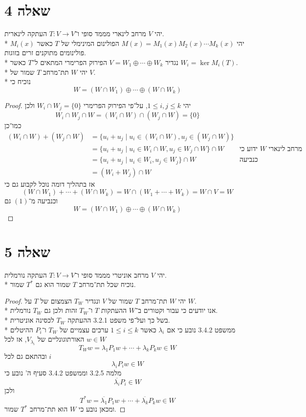 \section{שאלה 4}
יהי $V$ מרחב לינארי מממד סופי ו־$T : V \to V$ העתקה לינארית. \\*
יהי $M(x) = M_1(x) M_2(x) \cdots M_k(x)$ הפולינום המינימלי של $T$ כאשר $M_i(x)$ פולינומים מתוקנים זרים בזוגות. \\*
נגדיר $V = W_1 \oplus \cdots \oplus W_k$ הפירוק הפרימרי המתאים ל־$T$ כאשר $W_i = \ker M_i(T)$. \\*
יהי $W$ תת־מרחב $T$ שמור של $V$. \\*
נוכיח כי
\[
	W = (W \cap W_1) \oplus \cdots \oplus (W \cap W_k)
\]
\begin{proof}
	יהי $1 \le i, j \le k$, על־פי הפירוק הפרימרי $W_i \cap W_j = \{0\}$ ולכן
	\[
		W_i \cap W_j \cap W = (W_i \cap W) \cap (W_j \cap W) = \{ 0 \} \tag{1}
	\]
	כמו־כן
	\begin{align*}
		(W_i \cap W) + \left(W_j \cap W\right)
		& = \{ u_i + u_j \mid u_i \in (W_i \cap W), u_j \in (W_j \cap W) \} \\
		& = \{ u_i + u_j \mid u_i \in W_i \cap W, u_j \in W_j \cap W \} \cap W & \text{ידוע כי $W$ מרחב לינארי} \\
		& = \{ u_i + u_j \mid u_i \in W_i, u_j \in W_j \} \cap W & \text{כנביעה מתכונות המרחב} \\
		& = (W_i + W_j) \cap W
	\end{align*}
	אז בתהליך דומה נוכל לקבוע גם כי
	\[
		(W \cap W_1) + \cdots + (W \cap W_k) = W \cap (W_1 + \cdots + W_k) = W \cap V = W
	\]
	וכנביעה מ־$(1)$ גם
	\[
		W = (W \cap W_1) \oplus \cdots \oplus (W \cap W_k)
	\]
\end{proof}

\section{שאלה 5}
יהי $V$ מרחב אוניטרי מממד סופי ו־$T : V \to V$ העתקה נורמלית. \\*
נוכיח שכל תת־מרחב $T$ שמור הוא גם $T^*$ שמור.
\begin{proof}
	יהי $W$ תת־מרחב $T$ שמור של $V$ ונגדיר $T_W$ הצמצום של $T$ על $W$. \\*
	אנו יודעים כי עבור וקטורים ב־$W$ ההעתקות $T$ ו־$T_W$ זהות ולכן גם $T_W$ נורמלית. \\*
	בשל כך ועל־פי משפט 3.2.1 ההעתקה $T_W$ לכסינה אוניטרית. \\*
	ממשפט 3.4.2 נובע כי אם $\lambda_i$ כאשר $1 \le i \le k$ ערכים עצמיים של $T_W$ ו־$P_i$ ההיטלים האורתוגונליים של $V_{\lambda_i}$, אז לכל $w \in W$
	\[
		T_W w = \lambda_1 P_1 w + \cdots + \lambda_k P_k w \in W
	\]
	ובהתאם גם לכל $i$
	\[
		\lambda_i P_i w \in W
	\]
	מלמה 3.2.5 וממשפט 3.4.2 סעיף ה' נובע כי
	\[
		\overline{\lambda_i} P_i \in W
	\]
	ולכן
	\[
		T^* w = \overline{\lambda_1} P_1 w + \cdots + \overline{\lambda_k} P_k w \in W
	\]
	ומכאן נובע כי $W$ הוא תת־מרחב $T^*$ שמור.
\end{proof}


